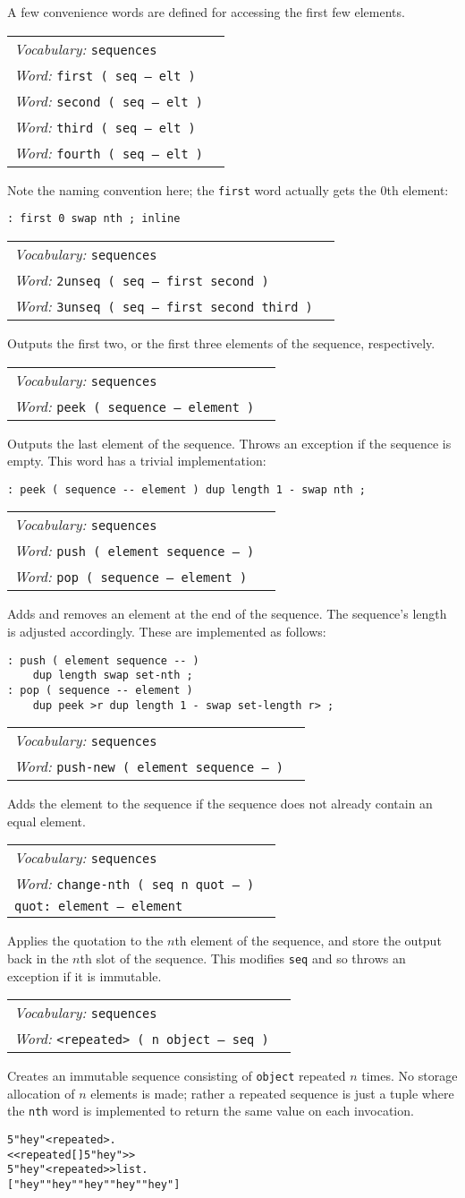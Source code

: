 \documentclass{book}
\newcommand{\vocabulary}[1]{\emph{Vocabulary:} \texttt{#1}&\\}
\newcommand{\ordinaryword}[2]{\index{\texttt{#1}}\emph{Word:} \texttt{#2}&\\}
\newcommand{\wordtable}[1]{


\begin{tabularx}{12cm}{lX}
\hline
#1
\hline
\end{tabularx}

}
\begin{document}
A few convenience words are defined for accessing the first few elements.
\wordtable{
\vocabulary{sequences}
\ordinaryword{first}{first ( seq -- elt )}
\ordinaryword{second}{second ( seq -- elt )}
\ordinaryword{third}{third ( seq -- elt )}
\ordinaryword{fourth}{fourth ( seq -- elt )}
}
Note the naming convention here; the \verb|first| word actually gets the 0th element:
\begin{verbatim}
: first 0 swap nth ; inline
\end{verbatim}
\wordtable{
\vocabulary{sequences}
\ordinaryword{2unseq}{2unseq ( seq -- first second )}
\ordinaryword{3unseq}{3unseq ( seq -- first second third )}
}
Outputs the first two, or the first three elements of the sequence, respectively.

\wordtable{
\vocabulary{sequences}
\ordinaryword{peek}{peek ( sequence -- element )}
}
Outputs the last element of the sequence. Throws an exception if the sequence is empty. This word has a trivial implementation:
\begin{verbatim}
: peek ( sequence -- element ) dup length 1 - swap nth ;
\end{verbatim}

\wordtable{
\vocabulary{sequences}
\ordinaryword{push}{push ( element sequence -- )}
\ordinaryword{pop}{pop ( sequence -- element )}
}

Adds and removes an element at the end of the sequence. The sequence's length is adjusted accordingly. These are implemented as follows:
\begin{verbatim}
: push ( element sequence -- )
    dup length swap set-nth ;
: pop ( sequence -- element )
    dup peek >r dup length 1 - swap set-length r> ;
\end{verbatim}

\wordtable{
\vocabulary{sequences}
\ordinaryword{push-new}{push-new ( element sequence -- )}
}

Adds the element to the sequence if the sequence does not already contain an equal element.

\wordtable{
\vocabulary{sequences}
\ordinaryword{change-nth}{change-nth ( seq n quot -- )}
\texttt{quot:~element -- element}\\
}
Applies the quotation to the $n$th element of the sequence, and store the output back in the $n$th slot of the sequence. This modifies \texttt{seq} and so throws an exception if it is immutable.
\wordtable{
\vocabulary{sequences}
\ordinaryword{<repeated>}{<repeated> ( n object -- seq )}
}
Creates an immutable sequence consisting of \verb|object| repeated $n$ times. No storage allocation of $n$ elements is made; rather a repeated sequence is just a tuple where the \verb|nth| word is implemented to return the same value on each invocation.
\begin{alltt}
  5 "hey" <repeated> .
<< repeated [ ] 5 "hey" >>
  5 "hey" <repeated> >list .
[ "hey" "hey" "hey" "hey" "hey" ]
\end{alltt}
\end{document}
